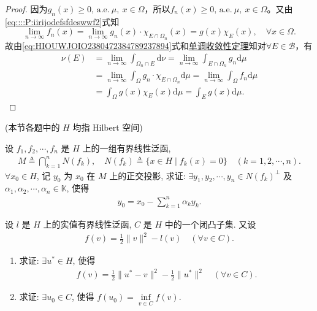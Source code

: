 \documentclass[../../main.tex]{subfiles}%
\begin{document}
\begin{proof}
因为$g_n\left( x \right) \geqslant 0,\,\mathrm{a}.\mathrm{e}.\ \mu,\ x\in \Omega$，所以$f_n\left( x \right) \geqslant 0,\,\mathrm{a}.\mathrm{e}.\ \mu,\ x\in \Omega$。又由\eqref{eq::::P:iirijodefsfdeswwf2}式知
$$\lim\limits_{n\rightarrow \infty}f_n\left( x \right) =\lim\limits_{n\rightarrow \infty}g_n\left( x \right) \cdot \chi _{E\cap \Omega _n}\left( x \right) =g\left( x \right) \chi _E\left( x \right),\quad \forall x\in \Omega.$$
故由\eqref{eq:HIOUWJOIO2380472384789237894}式和\hyperref[Real-Analysis-theorem:Beppo Levi非负渐升列积分定理]{单调收敛性定理}知对$\forall E\in \mathcal{B}$，有
\begin{align*}
\nu (E)&=\lim\limits_{n\rightarrow \infty} \int_{\Omega _n\cap E}{\mathrm{d}\nu}=\lim\limits_{n\rightarrow \infty} \int_{E\cap \Omega _n}{g_n\mathrm{d}\mu} \nonumber\\
&=\lim\limits_{n\rightarrow \infty} \int_{\Omega}{g_n\cdot \chi _{E\cap \Omega _n}\mathrm{d}\mu}=\lim\limits_{n\rightarrow \infty} \int_{\Omega}{f_n\mathrm{d}\mu} \nonumber\\
&=\int_{\Omega}{g\left( x \right) \chi _E\left( x \right) \mathrm{d}\mu}=\int_E{g\left( x \right) \mathrm{d}\mu}.
\end{align*}

\end{proof}

(本节各题中的 $H$ 均指 Hilbert 空间)

\begin{example}
设 $f_1, f_2, \cdots, f_n$ 是 $H$ 上的一组有界线性泛函,
\begin{align*}
M \triangleq \bigcap\limits_{k=1}^n N(f_k), \quad N(f_k) \triangleq \{x \in H \mid f_k(x) = 0\} \quad (k=1,2,\cdots,n).
\end{align*}
$\forall x_0 \in H$, 记 $y_0$ 为 $x_0$ 在 $M$ 上的正交投影, 求证: $\exists y_1, y_2, \cdots, y_n \in N(f_k)^\perp$ 及 $\alpha_1, \alpha_2, \cdots, \alpha_n \in \mathbb{K}$, 使得
\begin{align*}
y_0 = x_0 - \sum\limits_{k=1}^n \alpha_k y_k.
\end{align*}
\end{example}

\begin{example}
设 $l$ 是 $H$ 上的实值有界线性泛函, $C$ 是 $H$ 中的一个闭凸子集. 又设
\begin{align*}
f(v) = \frac{1}{2}\|v\|^2 - l(v) \quad (\forall v \in C).
\end{align*}
\begin{enumerate}[(1)]
\item 求证: $\exists u^* \in H$, 使得
\begin{align*}
f(v) = \frac{1}{2}\|u^* - v\|^2 - \frac{1}{2}\|u^*\|^2 \quad (\forall v \in C).
\end{align*}
\item 求证: $\exists u_0 \in C$, 使得 $f(u_0) = \inf\limits_{v \in C} f(v)$.
\end{enumerate}
\end{example}
\end{document}
